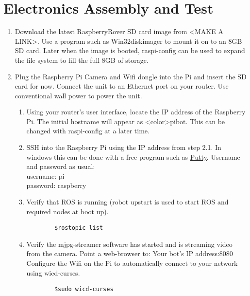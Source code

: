 \documentclass[12pt,titlepage,oneside]{memoir}
\begin{document}
\section{Electronics Assembly and Test}

\begin{enumerate}

\item Download the latest RaspberryRover SD card image from <MAKE A LINK>. Use a program such as Win32diskimager to mount it on to an 8GB SD card. Later when the image is booted, raspi-config can be used to expand the file system to fill the full 8GB of storage.
\item Plug the Raspberry Pi Camera and Wifi dongle into the Pi and insert the SD card for now. Connect the unit to an Ethernet port on your router. Use conventional wall power to power the unit.
	\begin{enumerate}
	\item  Using your router's user interface, locate the IP address of the Raspberry Pi. The initial hostname will appear as <color>pibot. This can be changed with raspi-config at a later time.
	\item SSH into the Raspberry Pi using the IP address from step 2.1. In windows this can be done with a free program such as \href{http://www.chiark.greenend.org.uk/~sgtatham/putty/download.html}{Putty}. Username and 			password as usual:\\
	username: pi\\
	password: raspberry\\
	\item Verify that ROS is running (robot upstart is used to start ROS and required nodes at boot up).\\
	\begin{verbatim}
		$rostopic list
	\end{verbatim}
	\item Verify the mjpg-streamer software has started and is streaming video from the camera. Point a web-browser to: Your bot's IP address:8080
	Configure the Wifi on the Pi to automatically connect to your network using wicd-curses.
	\begin{verbatim}
		$sudo wicd-curses
	\end{verbatim}
	\end{enumerate}


\end{enumerate}
\end{document}
